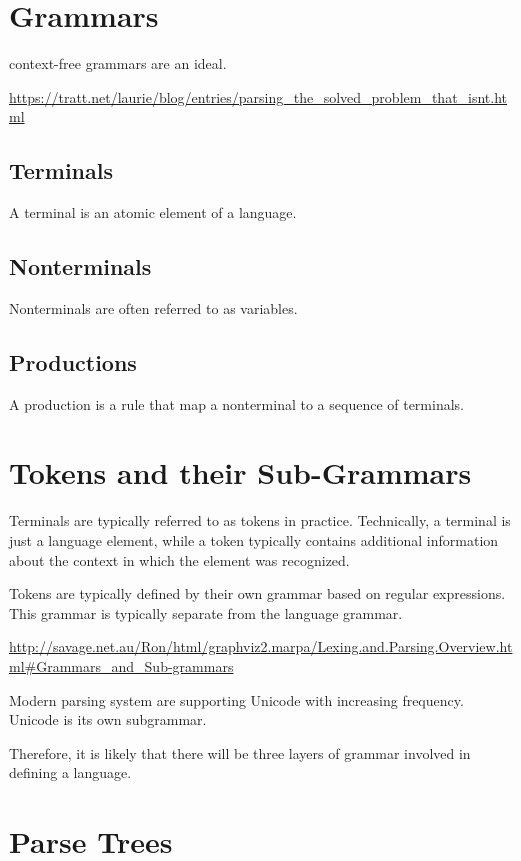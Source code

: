 \documentclass{book}
\begin{document}
\section{Grammars}
context-free grammars are an ideal.

\url{https://tratt.net/laurie/blog/entries/parsing_the_solved_problem_that_isnt.html}

\subsection{Terminals}
A terminal is an atomic element of a language.


\subsection{Nonterminals}
Nonterminals are often referred to as variables.

\subsection{Productions}
A production is a rule that map a nonterminal 
to a sequence of terminals.

\section{Tokens and their Sub-Grammars}
Terminals are typically referred to as tokens in practice. Technically, a
terminal is just a language element, while a token typically contains
additional information about the context in which the element was recognized.

Tokens are typically defined by their own grammar based on regular expressions.
This grammar is typically separate from the language grammar.

\url{http://savage.net.au/Ron/html/graphviz2.marpa/Lexing.and.Parsing.Overview.html#Grammars_and_Sub-grammars}

Modern parsing system are supporting Unicode with increasing frequency.
Unicode is its own subgrammar.

Therefore, it is likely that there will be three layers of grammar involved
in defining a language.

\section{Parse Trees}
\end{document}

